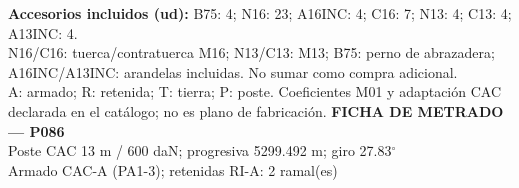 \begingroup\scriptsize
\textbf{Accesorios incluidos (ud):} B75: 4; N16: 23; A16INC: 4; C16: 7; N13: 4; C13: 4; A13INC: 4.\\
N16/C16: tuerca/contratuerca M16; N13/C13: M13; B75: perno de abrazadera; A16INC/A13INC: arandelas incluidas. No sumar como compra adicional.\\
A: armado; R: retenida; T: tierra; P: poste. Coeficientes M01 y adaptación CAC declarada en el catálogo; no es plano de fabricación.
\endgroup\endgroup
\clearpage{}
\begingroup\small\setlength{\parskip}{3pt}\renewcommand{\arraystretch}{1.05}
\textbf{\large FICHA DE METRADO — P086}\\[4pt]
Poste CAC 13 m / 600 daN; progresiva 5299.492 m; giro 27.83\ensuremath{^\circ}\\
Armado CAC-A (PA1-3); retenidas RI-A: 2 ramal(es)\\
\begingroup\scriptsize
